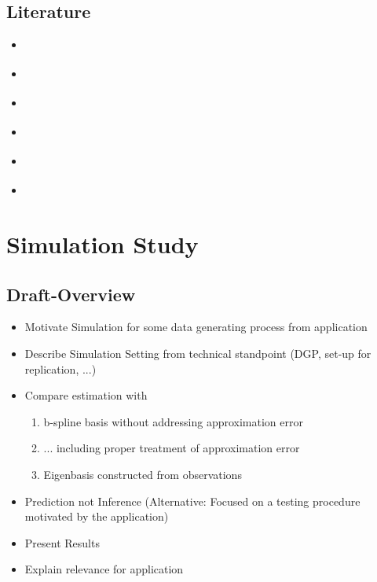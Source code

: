 \documentclass[11pt,twoside,a4paper]{article}
\begin{document}
	\subsection{Literature}
	\begin{itemize}
		\item \cite{kokoszka_introduction_2017}
		\item \cite{hsing_theoretical_2015}
		\item \cite{ramsay_functional_2005}
		\item \cite{horvath_inference_2012}
		\item \cite{cai_prediction_2006}
		\item \cite{levitin_introduction_2007}
	\end{itemize}
	
	\newpage
	\section{Simulation Study}
	
	\subsection{Draft-Overview}
	\begin{itemize}
		\item Motivate Simulation for some data generating process from application
		\item Describe Simulation Setting from technical standpoint (DGP, set-up for replication, ...)
		
		\item Compare estimation with \begin{enumerate}
			\item b-spline basis without addressing approximation error
			\item ... including proper treatment of approximation error
			\item Eigenbasis constructed from observations
			\end{enumerate}
	
		\item Prediction not Inference (Alternative: Focused on a testing procedure motivated by the application)
		\item Present Results
		\item Explain relevance for application
	\end{itemize}
\end{document}
